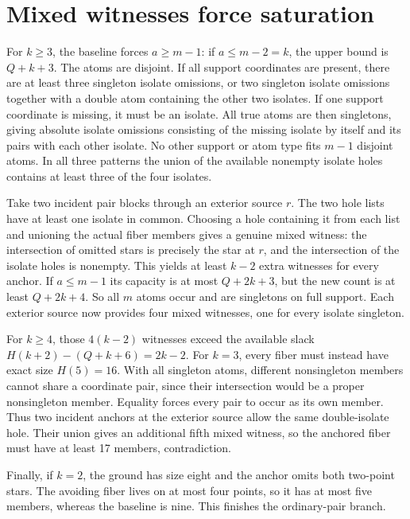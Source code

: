 \documentclass[11pt,letterpaper]{article}
\begin{document}
\section*{Mixed witnesses force saturation}
For \(k\ge3\), the baseline forces \(a\ge m-1\): if \(a\le
m-2=k\), the upper bound is \(Q+k+3\). The atoms are disjoint.
If all support coordinates are present, there are at least
three singleton isolate omissions, or two singleton isolate
omissions together with a double atom containing the other
two isolates. If one support coordinate is missing, it must
be an isolate. All true atoms are then singletons, giving
absolute isolate omissions consisting of the missing isolate
by itself and its pairs with each other isolate. No other
support or atom type fits \(m-1\) disjoint atoms. In all three
patterns the union of the available nonempty isolate holes
contains at least three of the four isolates.

Take two incident pair blocks through an exterior source
\(r\). The two hole lists have at least one isolate in common.
Choosing a hole containing it from each list and unioning the
actual fiber members gives a genuine mixed witness: the
intersection of omitted stars is precisely the star at
\(r\), and the intersection of the isolate holes is nonempty.
This yields at least \(k-2\) extra witnesses for every anchor.
If \(a\le m-1\) its capacity is at most \(Q+2k+3\), but the
new count is at least \(Q+2k+4\). So all \(m\) atoms occur and
are singletons on full support. Each exterior source now
provides four mixed witnesses, one for every isolate singleton.

For \(k\ge4\), those \(4(k-2)\) witnesses exceed the available
slack \(H(k+2)-(Q+k+6)=2k-2\). For \(k=3\), every fiber must
instead have exact size \(H(5)=16\). With all singleton
atoms, different nonsingleton members cannot share a coordinate
pair, since their intersection would be a proper
nonsingleton member. Equality forces every pair to occur
as its own member. Thus two incident anchors at the exterior
source allow the same double-isolate hole. Their union
gives an additional fifth mixed witness, so the anchored
fiber must have at least 17 members, contradiction.

Finally, if \(k=2\), the ground has size eight and the anchor
omits both two-point stars. The avoiding fiber lives on
at most four points, so it has at most five members, whereas
the baseline is nine. This finishes the ordinary-pair branch.
\end{document}
